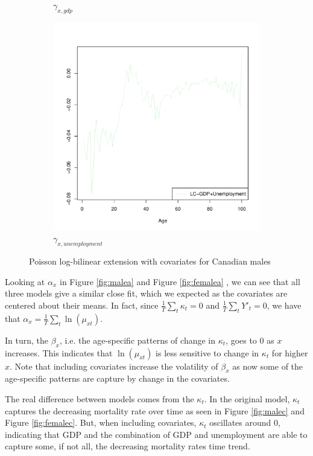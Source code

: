 \documentclass[AER, draftmode]{AEA}
\begin{document}
\begin{figure}[!htp]
\begin{subfigure}{0.4\textwidth}
		\caption{$\gamma_{x,gdp}$} 
		\label{fig:maled}
	\end{subfigure}
	\begin{subfigure}{0.4\textwidth}
		\includegraphics[width=\linewidth]{CAN_g2x_male} 
		\caption{$\gamma_{x,unemployment}$} 
		\label{fig:malee}
	\end{subfigure}
	\caption{Poisson log-bilinear extension with covariates for Canadian males}
\end{figure}

Looking at $\alpha_x$ in Figure \ref{fig:malea} and Figure \ref{fig:femalea} , we can see that all three models give a similar close fit, which we expected as the covariates are centered about their means. In fact, since $\frac{1}{T}\sum_t \kappa_t = 0$ and $\frac{1}{T}\sum_t Y'_t = 0$, we have that  $\alpha_x =\frac{1}{T} \sum_t \ln(\mu_{xt})$.

In turn, the $\beta_x$, i.e. the age-specific patterns of change in $\kappa_t$, goes to 0 as $x$ increases. This indicates that $\ln(\mu_{xt})$ is less sensitive to change in $\kappa_t$ for higher $x$. Note that including covariates increase the volatility of $\beta_x$ as now some of the age-specific patterns are capture by change in the covariates.

The real difference between models comes from the $\kappa_t$. In the original model, $\kappa_t$ captures the decreasing mortality rate over time as seen in Figure \ref{fig:malec} and Figure \ref{fig:femalec}. But, when including covariates, $\kappa_t$ oscillates around 0, indicating that GDP and the combination of GDP and unemployment are able to capture some, if not all, the decreasing mortality rates time trend.
\end{document}
